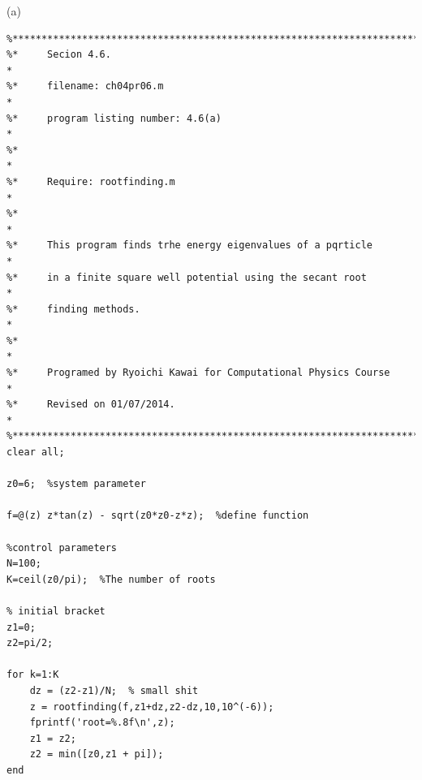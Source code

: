 \bigskip\noindent
\program(a)
\label{prog:square_well}
\footnotesize
\begin{verbatim}
%**************************************************************************
%*     Secion 4.6.                                                        *
%*     filename: ch04pr06.m                                               *
%*     program listing number: 4.6(a)                                     *
%*                                                                        *
%*     Require: rootfinding.m                                             *
%*                                                                        *
%*     This program finds trhe energy eigenvalues of a pqrticle           *
%*     in a finite square well potential using the secant root            *
%*     finding methods.                                                   *
%*                                                                        *
%*     Programed by Ryoichi Kawai for Computational Physics Course        *
%*     Revised on 01/07/2014.                                             *
%**************************************************************************
clear all;

z0=6;  %system parameter

f=@(z) z*tan(z) - sqrt(z0*z0-z*z);  %define function

%control parameters
N=100;
K=ceil(z0/pi);  %The number of roots

% initial bracket
z1=0;
z2=pi/2;

for k=1:K   
    dz = (z2-z1)/N;  % small shit
    z = rootfinding(f,z1+dz,z2-dz,10,10^(-6));
    fprintf('root=%.8f\n',z);
    z1 = z2;
    z2 = min([z0,z1 + pi]);
end
\end{verbatim}
\normalsize

